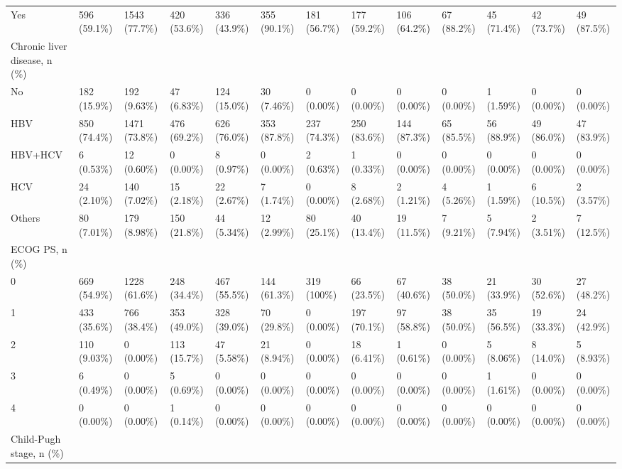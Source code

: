 \begin{landscape}
\begin{center}
\begin{longtable}{p{5.2cm}p{3.0cm}}
Yes & 596 (59.1\%) & 1543 (77.7\%) & 420 (53.6\%) & 336 (43.9\%) & 355 (90.1\%) & 181 (56.7\%) & 177 (59.2\%) & 106 (64.2\%) & 67 (88.2\%) & 45 (71.4\%) & 42 (73.7\%) & 49 (87.5\%) \\
Chronic liver disease, n (\%) &  &  &  &  &  &  &  &  &  &  &  &  \\
No & 182 (15.9\%) & 192 (9.63\%) & 47 (6.83\%) & 124 (15.0\%) & 30 (7.46\%) & 0 (0.00\%) & 0 (0.00\%) & 0 (0.00\%) & 0 (0.00\%) & 1 (1.59\%) & 0 (0.00\%) & 0 (0.00\%) \\
HBV & 850 (74.4\%) & 1471 (73.8\%) & 476 (69.2\%) & 626 (76.0\%) & 353 (87.8\%) & 237 (74.3\%) & 250 (83.6\%) & 144 (87.3\%) & 65 (85.5\%) & 56 (88.9\%) & 49 (86.0\%) & 47 (83.9\%) \\
HBV+HCV & 6 (0.53\%) & 12 (0.60\%) & 0 (0.00\%) & 8 (0.97\%) & 0 (0.00\%) & 2 (0.63\%) & 1 (0.33\%) & 0 (0.00\%) & 0 (0.00\%) & 0 (0.00\%) & 0 (0.00\%) & 0 (0.00\%) \\
HCV & 24 (2.10\%) & 140 (7.02\%) & 15 (2.18\%) & 22 (2.67\%) & 7 (1.74\%) & 0 (0.00\%) & 8 (2.68\%) & 2 (1.21\%) & 4 (5.26\%) & 1 (1.59\%) & 6 (10.5\%) & 2 (3.57\%) \\
Others & 80 (7.01\%) & 179 (8.98\%) & 150 (21.8\%) & 44 (5.34\%) & 12 (2.99\%) & 80 (25.1\%) & 40 (13.4\%) & 19 (11.5\%) & 7 (9.21\%) & 5 (7.94\%) & 2 (3.51\%) & 7 (12.5\%) \\
ECOG PS, n (\%) &  &  &  &  &  &  &  &  &  &  &  &  \\
0 & 669 (54.9\%) & 1228 (61.6\%) & 248 (34.4\%) & 467 (55.5\%) & 144 (61.3\%) & 319 (100\%) & 66 (23.5\%) & 67 (40.6\%) & 38 (50.0\%) & 21 (33.9\%) & 30 (52.6\%) & 27 (48.2\%) \\
1 & 433 (35.6\%) & 766 (38.4\%) & 353 (49.0\%) & 328 (39.0\%) & 70 (29.8\%) & 0 (0.00\%) & 197 (70.1\%) & 97 (58.8\%) & 38 (50.0\%) & 35 (56.5\%) & 19 (33.3\%) & 24 (42.9\%) \\
2 & 110 (9.03\%) & 0 (0.00\%) & 113 (15.7\%) & 47 (5.58\%) & 21 (8.94\%) & 0 (0.00\%) & 18 (6.41\%) & 1 (0.61\%) & 0 (0.00\%) & 5 (8.06\%) & 8 (14.0\%) & 5 (8.93\%) \\
3 & 6 (0.49\%) & 0 (0.00\%) & 5 (0.69\%) & 0 (0.00\%) & 0 (0.00\%) & 0 (0.00\%) & 0 (0.00\%) & 0 (0.00\%) & 0 (0.00\%) & 1 (1.61\%) & 0 (0.00\%) & 0 (0.00\%) \\
4 & 0 (0.00\%) & 0 (0.00\%) & 1 (0.14\%) & 0 (0.00\%) & 0 (0.00\%) & 0 (0.00\%) & 0 (0.00\%) & 0 (0.00\%) & 0 (0.00\%) & 0 (0.00\%) & 0 (0.00\%) & 0 (0.00\%) \\
Child-Pugh stage, n (\%) &  &  &  &  &  &  &  &  &  &  &  &  \\

\end{longtable}
\end{center}
\end{landscape}
